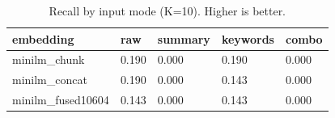 \begin{table}
\caption{Recall by input mode (K=10). Higher is better.}
\label{tab:recall-by-mode}
\begin{tabular}{lllll}
\toprule
embedding & raw & summary & keywords & combo \\
\midrule
minilm_chunk & 0.190 & 0.000 & 0.190 & 0.000 \\
minilm_concat & 0.190 & 0.000 & 0.143 & 0.000 \\
minilm_fused10604 & 0.143 & 0.000 & 0.143 & 0.000 \\
\bottomrule
\end{tabular}
\end{table}
